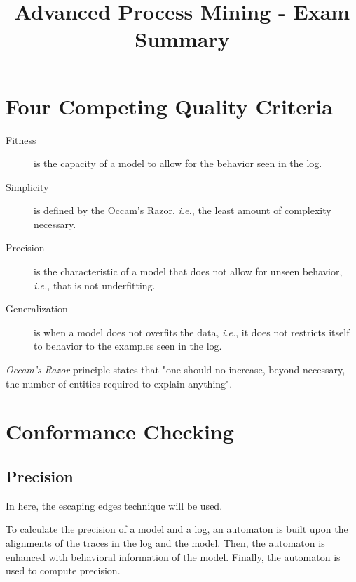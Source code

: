 \documentclass[a4paper]{report}
\title{Advanced Process Mining - Exam Summary}
\begin{document}
\section*{Four Competing Quality Criteria}

\begin{description}
    \item[Fitness] is the capacity of a model to allow for the behavior seen in the log.
    \item[Simplicity] is defined by the Occam's Razor, \emph{i.e.}, the least amount of complexity necessary.
    \item[Precision] is the characteristic of a model that does not allow for unseen behavior, \emph{i.e.}, that is not underfitting.
    \item[Generalization] is when a model does not overfits the data, \emph{i.e.}, it does not restricts itself to behavior to the examples seen in the log.
\end{description}

\begin{note}
    \emph{Occam's Razor} principle states that "one should no increase, beyond necessary, the number of entities required to explain anything".
\end{note}

\section*{Conformance Checking}

\subsection*{Precision}

In here, the escaping edges technique will be used.

To calculate the precision of a model and a log, an automaton is built upon the alignments of the traces in the log and the model. Then, the automaton is enhanced with behavioral information of the model. Finally, the automaton is used to compute precision.
\end{document}
